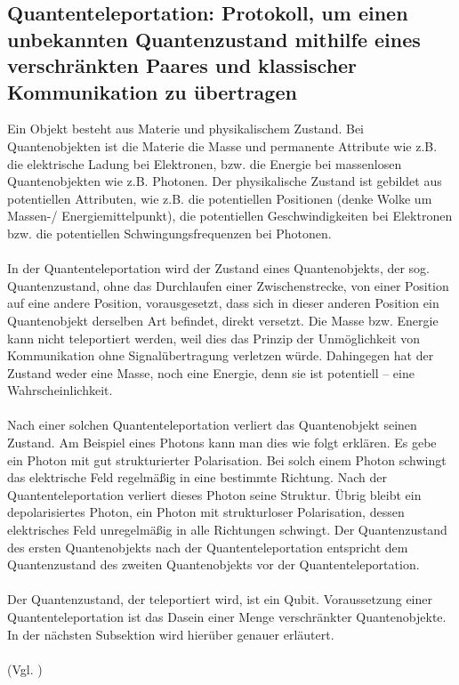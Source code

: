 \subsection{Quantenteleportation: Protokoll, um einen unbekannten Quantenzustand mithilfe eines verschränkten Paares und klassischer Kommunikation zu übertragen}
Ein Objekt besteht aus Materie und physikalischem Zustand. Bei Quantenobjekten ist die Materie die Masse und permanente Attribute wie z.B. die elektrische Ladung bei Elektronen, bzw. die Energie bei massenlosen Quantenobjekten wie z.B. Photonen. Der physikalische Zustand ist gebildet aus potentiellen Attributen, wie z.B. die potentiellen Positionen (denke Wolke um Massen-/ Energiemittelpunkt), die potentiellen Geschwindigkeiten bei Elektronen bzw. die potentiellen Schwingungsfrequenzen bei Photonen.\\
\\
In der Quantenteleportation wird der Zustand eines Quantenobjekts, der sog. Quantenzustand, ohne das Durchlaufen einer Zwischenstrecke, von einer Position auf eine andere Position, vorausgesetzt, dass sich in dieser anderen Position ein Quantenobjekt derselben Art befindet, direkt versetzt. Die Masse bzw. Energie kann nicht teleportiert werden, weil dies das Prinzip der Unmöglichkeit von Kommunikation ohne Signalübertragung verletzen würde. Dahingegen hat der Zustand weder eine Masse, noch eine Energie, denn sie ist potentiell – eine Wahrscheinlichkeit.\\
\\
Nach einer solchen Quantenteleportation verliert das Quantenobjekt seinen Zustand. Am Beispiel eines Photons kann man dies wie folgt erklären. Es gebe ein Photon mit gut strukturierter Polarisation. Bei solch einem Photon schwingt das elektrische Feld regelmäßig in eine bestimmte Richtung. Nach der Quantenteleportation verliert dieses Photon seine Struktur. Übrig bleibt ein depolarisiertes Photon, ein Photon mit strukturloser Polarisation, dessen elektrisches Feld unregelmäßig in alle Richtungen schwingt. Der Quantenzustand des ersten Quantenobjekts nach der Quantenteleportation entspricht dem Quantenzustand des zweiten Quantenobjekts vor der Quantenteleportation.\\
\\
Der Quantenzustand, der teleportiert wird, ist ein Qubit. Voraussetzung einer Quantenteleportation ist das Dasein einer Menge verschränkter Quantenobjekte. In der nächsten Subsektion wird hierüber genauer erläutert.\\
\\
(Vgl. \cite[S.124-128]{gisin_unbegreifliche_2014}) 


